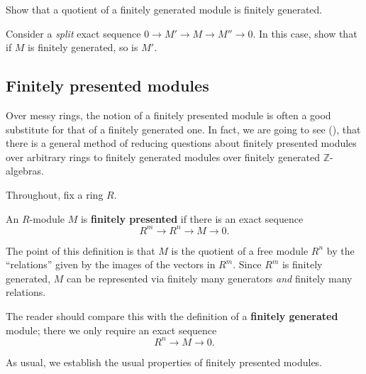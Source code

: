 \begin{exercise} 
Show that a quotient of a finitely generated module is finitely generated.
\end{exercise}

\begin{exercise} 
Consider a \emph{split} exact sequence $0 \to M' \to M \to M'' \to 0$. In this
case, show that if $M$ is finitely generated, so is $M'$.
\end{exercise} 


\subsection{Finitely presented modules}

Over messy rings, the notion of a finitely presented module is often a good
substitute for that of a finitely generated one. In fact, we are going to see
(\rref{}), that there is a general method of reducing questions about finitely
presented modules over arbitrary rings to finitely generated modules over
finitely generated $\mathbb{Z}$-algebras.

Throughout, fix a ring $R$.

\begin{definition} 
An $R$-module $M$ is \textbf{finitely presented} if there is an exact sequence
\[ R^m \to R^n \to M \to 0.  \]
\end{definition} 

The point of this definition is that $M$ is the quotient of a free module
$R^n$ by the ``relations'' given by the images of the vectors in $R^m$. 
Since $R^m$ is finitely generated, $M$ can be represented via finitely many
generators \emph{and} finitely many relations.

The reader should compare this with the definition of a \textbf{finitely
generated} module; there we only require an exact sequence
\[ R^n \to M \to 0.  \]

As usual, we establish the usual properties of finitely presented modules.

